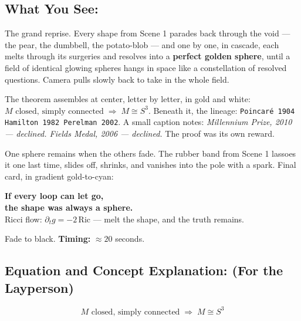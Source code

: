 \documentclass[11pt]{article}
\begin{document}
\subsection*{What You See:}

The grand reprise. Every shape from Scene 1 parades back through the void --- the
pear, the dumbbell, the potato-blob --- and one by one, in cascade, each melts through
its surgeries and resolves into a \textbf{perfect golden sphere}, until a field of
identical glowing spheres hangs in space like a constellation of resolved questions.
Camera pulls slowly back to take in the whole field.

The theorem assembles at center, letter by letter, in gold and white:
\( M \text{ closed, simply connected} \;\Longrightarrow\; M \cong S^3 \).
Beneath it, the lineage: \texttt{Poincar\'e 1904 \;\to\; Hamilton 1982 \;\to\; Perelman 2002}.
A small caption notes: \emph{Millennium Prize, 2010 --- declined. Fields Medal, 2006
--- declined.} The proof was its own reward.

One sphere remains when the others fade. The rubber band from Scene 1 lassoes it one
last time, slides off, shrinks, and vanishes into the pole with a spark. Final card,
in gradient gold-to-cyan:

\begin{center}
\textbf{If every loop can let go,}\\
\textbf{the shape was always a sphere.}\\
\smallskip
\small Ricci flow: \(\partial_t g = -2\,\mathrm{Ric}\) --- melt the shape, and the truth remains.
\end{center}

Fade to black. \textbf{Timing:} $\approx 20$ seconds.

\subsection*{Equation and Concept Explanation: (For the Layperson)}

\[
M \text{ closed, simply connected} \;\Longrightarrow\; M \cong S^3
\]
\end{document}
